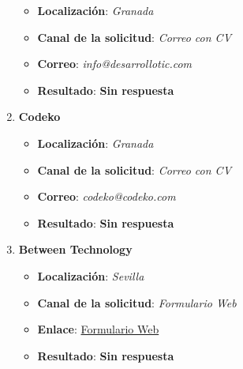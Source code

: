 \begin{enumerate}
\begin{itemize}
		\item \textbf{Localización}: \textit{Granada}
		\item \textbf{Canal de la solicitud}: \textit{Correo con CV}
		\item \textbf{Correo}: \textit{info@desarrollotic.com}
		\item \textbf{Resultado}: {\color{orange} \textbf{Sin respuesta}}
	\end{itemize}
	\item \textbf{Codeko}
	\begin{itemize}
		\item \textbf{Localización}: \textit{Granada}
		\item \textbf{Canal de la solicitud}: \textit{Correo con CV}
		\item \textbf{Correo}: \textit{codeko@codeko.com}
		\item \textbf{Resultado}: {\color{orange} \textbf{Sin respuesta}}
	\end{itemize}
	\item \textbf{Between Technology}
	\begin{itemize}
		\item \textbf{Localización}: \textit{Sevilla}
		\item \textbf{Canal de la solicitud}: \textit{Formulario Web}
		\item \textbf{Enlace}: \href{https://between.talentclue.com/es/node/add/cv/job/5810780/company/94766327/12623479?clicked_button=apply_manually}{Formulario Web}
		\item \textbf{Resultado}: {\color{orange} \textbf{Sin respuesta}}
	\end{itemize}
\end{enumerate}







%

